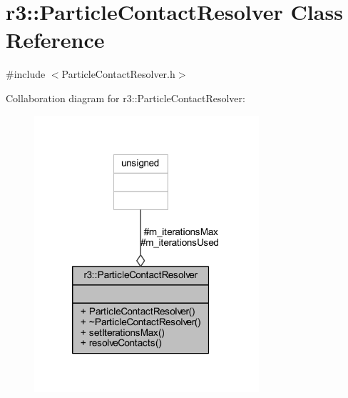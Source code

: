 \hypertarget{classr3_1_1_particle_contact_resolver}{}\section{r3\+:\+:Particle\+Contact\+Resolver Class Reference}
\label{classr3_1_1_particle_contact_resolver}


{\ttfamily \#include $<$Particle\+Contact\+Resolver.\+h$>$}



Collaboration diagram for r3\+:\+:Particle\+Contact\+Resolver\+:\nopagebreak
\begin{figure}[H]
\begin{center}
\leavevmode
\includegraphics[width=236pt]{classr3_1_1_particle_contact_resolver__coll__graph}
\end{center}
\end{figure}
